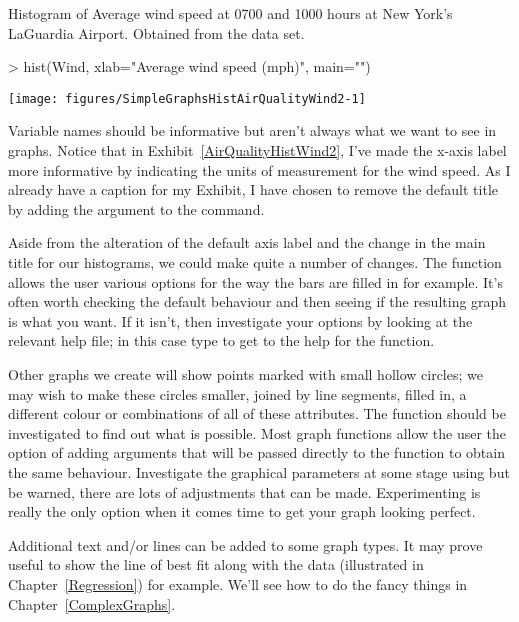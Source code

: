\begin{exhibit}
\begin{center}
\caption{Histogram of Average wind speed at 0700 and 1000 hours at New York's LaGuardia Airport. Obtained from the  data set.}
\label{AirQualityHistWind2}
\begin{Schunk}
\begin{Sinput}
> hist(Wind, xlab="Average wind speed (mph)", main="")
\end{Sinput}

\texttt{[image: figures/SimpleGraphsHistAirQualityWind2-1]} \end{Schunk}
\end{center}
\end{exhibit}

Variable names should be informative but aren't always what we want to see in graphs. Notice that in Exhibit~\ref{AirQualityHistWind2}, I've made the x-axis label more informative by indicating the units of measurement for the wind speed. As I already have a caption for my Exhibit, I have chosen to remove the default title by adding the argument  to the  command.

Aside from the alteration of the default axis label and the change in the main title for our histograms, we could make quite a number of changes. The  function allows the user various options for the way the bars are filled in for example. It's often worth checking the default behaviour and then seeing if the resulting graph is what you want. If it isn't, then investigate your options by looking at the relevant help file; in this case type  to get to the help for the  function.

 Other graphs we create will show points marked with small hollow circles; we may wish to make these circles smaller, joined by line segments, filled in, a different colour or combinations of all of these attributes. The  function should be investigated to find out what is possible. Most graph functions allow the user the option of adding arguments that will be passed directly to the  function to obtain the same behaviour. Investigate the graphical parameters at some stage using  but be warned, there are lots of adjustments that can be made. Experimenting is really the only option when it comes time to get your graph looking perfect.

Additional text and/or lines can be added to some graph types. It may prove useful to show the line of best fit along with the data (illustrated in Chapter~\ref{Regression}) for example. We'll see how to do the fancy things in Chapter~\ref{ComplexGraphs}.

